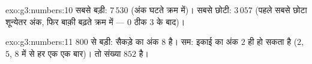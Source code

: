 \begin{solution}{exo:g3:numbers:10}
सबसे बड़ी: $7\,530$ (अंक घटते क्रम में)। सबसे छोटी: $3\,057$
(पहले सबसे छोटा शून्येतर अंक, फिर बाक़ी बढ़ते क्रम में --- $0$
ठीक $3$ के बाद)।
\end{solution}

\begin{solution}{exo:g3:numbers:11}
$800$ से बड़ी: सैकड़े का अंक $8$ है। सम: इकाई का अंक
$2$ ही हो सकता है ($2$, $5$, $8$ में से हर एक एक बार)। तो संख्या
$852$ है।
\end{solution}
